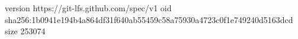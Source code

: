 version https://git-lfs.github.com/spec/v1
oid sha256:1b0941e194b4a864df31f640ab55459c58a75930a4723c0f1e749240d5163dcd
size 253074
